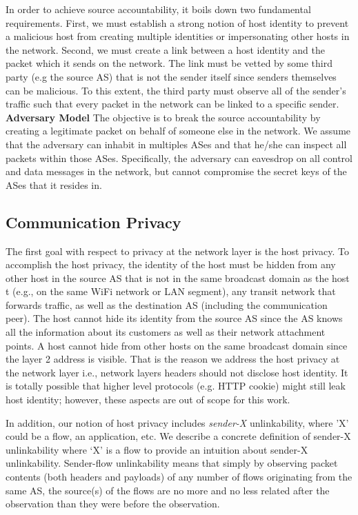 In order to achieve source accountability, it boils down two fundamental requirements. First, we must establish a strong notion of host identity to prevent a malicious host from creating multiple identities or impersonating other hosts in the network. Second, we must create a link between a host identity and the packet which it sends on the network. The link must be vetted by some third party (e.g the source AS) that is not the sender itself since senders themselves can be malicious. To this extent, the third party must observe all of the sender’s traffic such that every packet in the network can be linked to a specific sender.
\newline \newline
\textbf{Adversary Model} \newline \newline
The objective is to break the source accountability by creating a legitimate packet on behalf of someone else in the network. We assume that the adversary can inhabit in multiples ASes and that he/she can inspect all packets within those ASes. Specifically, the adversary can eavesdrop on all control and data messages in the network, but cannot compromise the secret keys of the ASes that it resides in.

\subsection{Communication Privacy}
The first goal with respect to privacy at the network layer is the host privacy. To accomplish the host privacy, the identity of the host must be hidden from any other host in the source AS that is not in the same broadcast domain as the host t (e.g., on the same WiFi network or LAN segment), any transit network that forwards traffic, as well as the destination AS (including the communication peer). The host cannot hide its identity from the source AS since the AS knows all the information about its customers as well as their network attachment points. A host cannot hide from other hosts on the same broadcast domain since the layer 2 address is visible. That is the reason we address the host privacy at the network layer i.e., network layers headers should not disclose host identity. It is totally possible that higher level protocols (e.g. HTTP cookie) might still leak host identity; however, these aspects are out of scope for this work.

In addition, our notion of host privacy includes \textit{sender-X} unlinkability, where 'X' could be a flow, an application, etc. We describe a concrete definition of sender-X unlinkability where ‘X’ is a flow to provide an intuition about sender-X unlinkability. Sender-flow unlinkability means that simply by observing packet contents (both headers and payloads) of any number of flows originating from the same AS, the source(s) of the flows are no more and no less related after the observation than they were before the observation.

